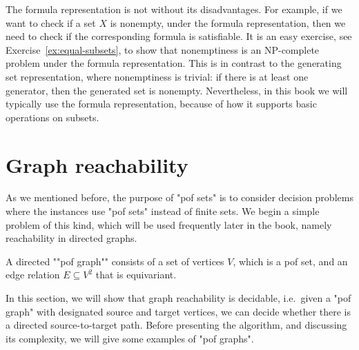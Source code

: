 The formula representation is not without its disadvantages. For example, if we want to check if a set $X$ is nonempty, under the formula representation, then we need to check if the corresponding formula is satisfiable. It is an easy exercise, see Exercise~\ref{ex:equal-subsets}, to show that nonemptiness is  an NP-complete problem under the formula representation. This is in contrast to the  generating set representation, where nonemptiness is trivial: if there is at least one generator, then the generated set is nonempty. Nevertheless, in this book we will typically use the  formula representation, because of how it supports basic operations on subsets. 

\exercisepart





\section{Graph reachability}
\label{sec:pof-graphs}
As we mentioned before, the purpose of "pof sets" is to consider decision problems where the instances use "pof sets" instead of finite sets. We begin a simple problem of this kind, which will be used frequently later in the book, namely reachability in directed graphs. 

\begin{definition}
    A directed ""pof graph"" consists of a set of vertices $V$, which is a pof set, and an edge relation $E \subseteq V^2$ that is equivariant. 
\end{definition}

In this section, we will show that graph reachability is decidable, i.e.~given a "pof graph" with designated source and target vertices, we can decide whether there is a directed source-to-target path. Before presenting the algorithm, and discussing its complexity, we will give some examples of "pof graphs".

